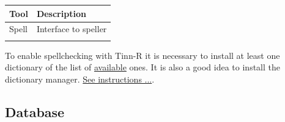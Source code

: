 \begin{footnotesize}
  \begin{tabularx}{\textwidth}{>{\hsize=0.3\hsize}X>{\hsize=0.7\hsize}X}\\
    \hline
    \textbf{Tool} & \textbf{Description} \\
    \hline
    Spell & Interface to speller \\
    \hline
    \\
  \end{tabularx}
\end{footnotesize}

To enable spellchecking with Tinn-R it is necessary to install at
least one dictionary of the list of
\href{http://www.luziusschneider.com/Speller/English/index.htm}{available} ones.
It is also a good idea to install the dictionary manager.
\href{\#configuration\_spellerinstalation}{See instructions ...}.


\hypertarget{working_tools_database}{}
\subsection{Database}

